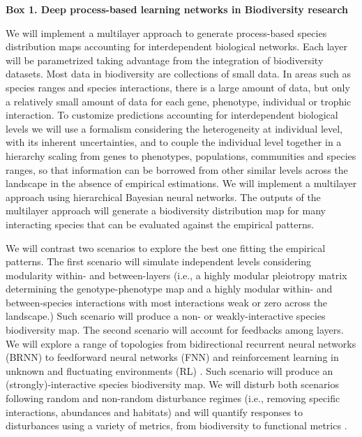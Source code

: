 \documentclass[authoryear,1p,12pt]{elsarticle}
\begin{document}
\begin{mybox}\begin{singlespace}
{\bf{Box 1. Deep process-based learning networks in Biodiversity research}}\\
\begin{small}
  We will implement a multilayer approach to generate process-based
  species distribution maps accounting for interdependent biological
  networks. Each layer will be parametrized taking advantage from the
  integration of biodiversity datasets. Most data in biodiversity are
  collections of small data. In areas such as species ranges and
  species interactions, there is a large amount of data, but only a
  relatively small amount of data for each gene, phenotype, individual
  or trophic interaction. To customize predictions accounting for
  interdependent biological levels we will use a formalism considering
  the heterogeneity at individual level, with its inherent
  uncertainties, and to couple the individual level together in a
  hierarchy scaling from genes to phenotypes, populations, communities
  and species ranges, so that information can be borrowed from other
  similar levels across the landscape in the absence of empirical
  estimations. We will implement a multilayer approach using
  hierarchical Bayesian neural networks\cite{Ghahramani:2015}. The outputs of the
  multilayer approach will generate a biodiversity distribution map
  for many interacting species that can be evaluated against the
  empirical patterns.

  We will contrast two scenarios to explore the best one fitting the
  empirical patterns. The first scenario will simulate independent
  levels considering modularity within- and between-layers (i.e., a
  highly modular pleiotropy matrix determining the genotype-phenotype
  map and a highly modular within- and between-species interactions
  with most interactions weak or zero across the landscape.) Such
  scenario will produce a non- or weakly-interactive species
  biodiversity map. The second scenario will account for feedbacks
  among layers. We will explore a range of topologies from
  bidirectional recurrent neural networks (BRNN) to feedforward neural
  networks (FNN) and reinforcement learning in unknown and fluctuating
  environments (RL) \cite{Schmidhuber:2015}. Such scenario will produce an (strongly)-interactive
  species biodiversity map. We will disturb both scenarios following
  random and non-random disturbance regimes (i.e., removing specific
  interactions, abundances and habitats) and will quantify responses
  to disturbances using a variety of metrics, from biodiversity to
  functional metrics \cite{Melian2018}.
\end{small}
\end{singlespace}
\end{mybox}
\end{document}
